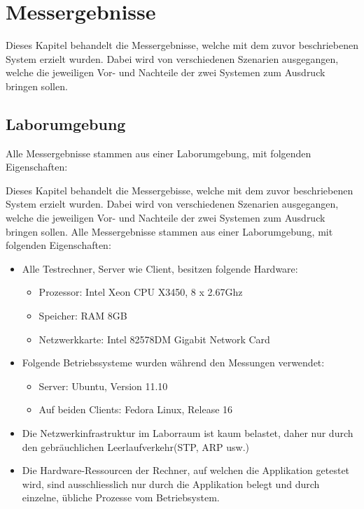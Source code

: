 \chapter{Messergebnisse}

Dieses Kapitel be\-han\-delt die Mess\-er\-geb\-nis\-se, welche mit dem zu\-vor be\-schrie\-be\-nen System erzielt wurden. Dabei wird von verschiedenen Sze\-narien aus\-ge\-gang\-en, welche die jeweiligen Vor- und Nach\-teile der zwei Sy\-stem\-en zum Ausdruck bringen sollen. 

\section{Laborumgebung}

Alle Messergebnisse stammen aus einer La\-bor\-um\-gebung, mit fol\-gen\-den Ei\-gen\-schaf\-ten:

Dieses Kapitel be\-handelt die Mes\-ser\-ge\-bis\-se, welche mit dem zuvor be\-schrie\-benen System erzielt wurden. Dabei wird von verschiedenen Szenarien ausgegangen, welche die jeweiligen Vor- und Nachteile der zwei Systemen zum Ausdruck bringen sollen. \newline
Alle Mes\-ser\-ge\-bnis\-se stam\-men aus einer Labor\-umgebung, mit folgenden Ei\-gen\-schaf\-ten:

\begin{itemize}
\item Alle Testrechner, Server wie Client, besitzen folgende Hardware:
\begin{itemize}
\item Prozessor: Intel Xeon CPU X3450, 8 x 2.67Ghz
\item Speicher: RAM 8GB
\item Netzwerkkarte: Intel 82578DM Gigabit Network Card
\end{itemize}
\item Folgende Betriebssysteme wurden während den Messungen verwendet:
\begin{itemize}
\item Server: Ubuntu, Version 11.10
\item Auf beiden Clients: Fedora Linux, Release 16
\end{itemize}
\item Die Netzwerkinfrastruktur im Laborraum ist kaum belastet, daher nur durch den gebräuchlichen Leerlaufverkehr(\gls{STP}, \gls{ARP} usw.)
\item Die Hardware-Ressourcen der Rechner, auf welchen die Applikation getestet wird, sind ausschliesslich nur durch die Applikation belegt und durch einzelne, übliche Prozesse vom  Betriebsystem.
\end{itemize}

